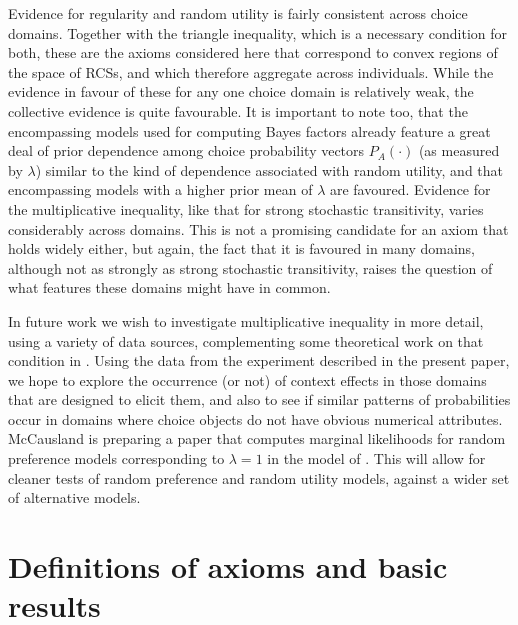 \documentclass[11pt,letter]{article}
\begin{document}
Evidence for regularity and random utility is fairly consistent across choice domains.
Together with the triangle inequality, which is a necessary condition for both, these are the axioms considered here that correspond to convex regions of the space of RCSs, and which therefore aggregate across individuals.
While the evidence in favour of these for any one choice domain is relatively weak, the collective evidence is quite favourable.
It is important to note too, that the encompassing models used for computing Bayes factors already feature a great deal of prior dependence among choice probability vectors $P_A(\cdot)$ (as measured by $\lambda$) similar to the kind of dependence associated with random utility, and that encompassing models with a higher prior mean of $\lambda$ are favoured.
Evidence for the multiplicative inequality, like that for strong stochastic transitivity, varies considerably across domains.
This is not a promising candidate for an axiom that holds widely either, but again, the fact that it is favoured in many domains, although not as strongly as strong stochastic transitivity, raises the question of what features these domains might have in common.

In future work we wish to investigate  multiplicative inequality in more detail, using a variety of data sources, complementing some theoretical work on that condition in .
Using the data from the experiment described in the present paper, we hope to explore the occurrence (or not) of context effects in those domains that are designed to elicit them, and also to see if similar patterns of probabilities occur in domains where choice objects do not have obvious numerical attributes.
McCausland is preparing a paper that computes marginal likelihoods for random preference models corresponding to $\lambda = 1$ in the model of .
This will allow for cleaner tests of random preference and random utility models, against a wider set of alternative models.

\appendix

\section{Definitions of axioms and basic results}\label{s:axioms}
\end{document}
